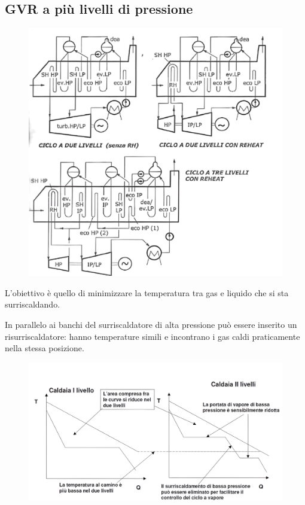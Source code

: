 \subsection{GVR a più livelli di pressione}
\begin{adjustwidth}{2in}{}
	\begin{figure}[H]
		\centering
		\includegraphics[width=0.8\linewidth]{immagini/impianticombinati10}
		\label{fig:impianticombinati10}
	\end{figure}
	L'obiettivo è quello di minimizzare la temperatura tra gas e liquido che si sta surriscaldando. \newline 
	
	In parallelo ai banchi del surriscaldatore di alta pressione può essere inserito un risurriscaldatore: hanno temperature simili e incontrano i gas caldi praticamente nella stessa posizione.
	\begin{figure}[H]
		\centering
		\includegraphics[width=0.8\linewidth]{immagini/impianticombinati11}
		\label{fig:impianticombinati11}
	\end{figure}	
\end{adjustwidth}

